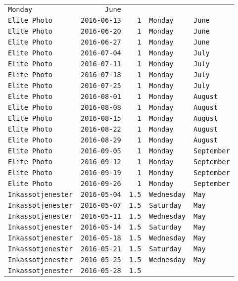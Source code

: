 \documentclass[11pt,A4paper,]{article}
\begin{document}
\begin{longtable}[]{@{}lrrll@{}}
\texttt{Monday} & \texttt{June}\tabularnewline
\texttt{Elite\ Photo} & \texttt{2016-06-13} & \texttt{1} &
\texttt{Monday} & \texttt{June}\tabularnewline
\texttt{Elite\ Photo} & \texttt{2016-06-20} & \texttt{1} &
\texttt{Monday} & \texttt{June}\tabularnewline
\texttt{Elite\ Photo} & \texttt{2016-06-27} & \texttt{1} &
\texttt{Monday} & \texttt{June}\tabularnewline
\texttt{Elite\ Photo} & \texttt{2016-07-04} & \texttt{1} &
\texttt{Monday} & \texttt{July}\tabularnewline
\texttt{Elite\ Photo} & \texttt{2016-07-11} & \texttt{1} &
\texttt{Monday} & \texttt{July}\tabularnewline
\texttt{Elite\ Photo} & \texttt{2016-07-18} & \texttt{1} &
\texttt{Monday} & \texttt{July}\tabularnewline
\texttt{Elite\ Photo} & \texttt{2016-07-25} & \texttt{1} &
\texttt{Monday} & \texttt{July}\tabularnewline
\texttt{Elite\ Photo} & \texttt{2016-08-01} & \texttt{1} &
\texttt{Monday} & \texttt{August}\tabularnewline
\texttt{Elite\ Photo} & \texttt{2016-08-08} & \texttt{1} &
\texttt{Monday} & \texttt{August}\tabularnewline
\texttt{Elite\ Photo} & \texttt{2016-08-15} & \texttt{1} &
\texttt{Monday} & \texttt{August}\tabularnewline
\texttt{Elite\ Photo} & \texttt{2016-08-22} & \texttt{1} &
\texttt{Monday} & \texttt{August}\tabularnewline
\texttt{Elite\ Photo} & \texttt{2016-08-29} & \texttt{1} &
\texttt{Monday} & \texttt{August}\tabularnewline
\texttt{Elite\ Photo} & \texttt{2016-09-05} & \texttt{1} &
\texttt{Monday} & \texttt{September}\tabularnewline
\texttt{Elite\ Photo} & \texttt{2016-09-12} & \texttt{1} &
\texttt{Monday} & \texttt{September}\tabularnewline
\texttt{Elite\ Photo} & \texttt{2016-09-19} & \texttt{1} &
\texttt{Monday} & \texttt{September}\tabularnewline
\texttt{Elite\ Photo} & \texttt{2016-09-26} & \texttt{1} &
\texttt{Monday} & \texttt{September}\tabularnewline
\texttt{Inkassotjenester} & \texttt{2016-05-04} & \texttt{1.5} &
\texttt{Wednesday} & \texttt{May}\tabularnewline
\texttt{Inkassotjenester} & \texttt{2016-05-07} & \texttt{1.5} &
\texttt{Saturday} & \texttt{May}\tabularnewline
\texttt{Inkassotjenester} & \texttt{2016-05-11} & \texttt{1.5} &
\texttt{Wednesday} & \texttt{May}\tabularnewline
\texttt{Inkassotjenester} & \texttt{2016-05-14} & \texttt{1.5} &
\texttt{Saturday} & \texttt{May}\tabularnewline
\texttt{Inkassotjenester} & \texttt{2016-05-18} & \texttt{1.5} &
\texttt{Wednesday} & \texttt{May}\tabularnewline
\texttt{Inkassotjenester} & \texttt{2016-05-21} & \texttt{1.5} &
\texttt{Saturday} & \texttt{May}\tabularnewline
\texttt{Inkassotjenester} & \texttt{2016-05-25} & \texttt{1.5} &
\texttt{Wednesday} & \texttt{May}\tabularnewline
\texttt{Inkassotjenester} & \texttt{2016-05-28} & \texttt{1.5} &

\end{longtable}
\end{document}
